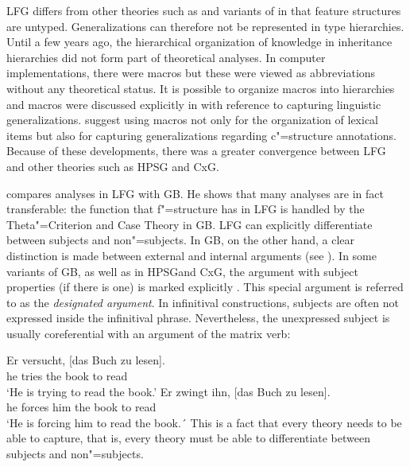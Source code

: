 LFG differs from other theories such as \hpsg and variants of \cxg in that feature structures are untyped. Generalizations can therefore not be represented in type hierarchies. 
Until a few years ago, the hierarchical organization of knowledge in inheritance hierarchies did not form part of theoretical analyses. In computer implementations,
there were macros but these were viewed as abbreviations without any theoretical status. It is possible to organize macros into hierarchies and macros were discussed explicitly
in  with reference to capturing linguistic generalizations. \citet*{ADT2008a} suggest using macros not only for the organization of lexical items but also for
capturing generalizations regarding c"=structure annotations. Because of these developments, there was a greater convergence between LFG and other theories such as HPSG and CxG.

\citet{Williams84a} compares analyses in LFG with GB. He shows that many analyses are in fact transferable: the function that f"=structure has in LFG is handled by the
Theta"=Criterion and Case Theory in GB. LFG can explicitly differentiate between subjects and non"=subjects. In GB, on the other hand,
a clear distinction is made between external and internal arguments (see \citealp[Section~1.2]{Williams84a}). In some variants of GB, as well as
in HPSG\indexhpsg and CxG\indexcxg, the argument with subject properties (if there is one) is marked explicitly \citep{Haider86,HM94a,Mueller2003e,MR2001a}. This special argument
is referred to as the \emph{designated argument}. In infinitival constructions, subjects are often not expressed inside the infinitival phrase. Nevertheless, 
the unexpressed subject is usually coreferential with an argument of the matrix verb:

\eal
\ex 
\gll Er versucht, [das Buch zu lesen].\\
	 he tries \spacebr{}the book to read\\
\glt `He is trying to read the book.'
\ex 
\gll Er zwingt ihn, [das Buch zu lesen].\\
	 he forces him \spacebr{}the book to read\\
\glt `He is forcing him to read the book.´
\zl 
This is a fact that every theory needs to be able to capture, that is, every theory must be able to differentiate between subjects and non"=subjects.

